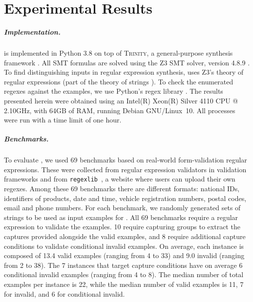 \chapter{Experimental Results}\label{chap:results}

\paragraph{Implementation.}
\Forest{} is implemented in Python 3.8 on top of \textsc{Trinity}, a general-purpose synthesis framework \cite{trinity19}.
All \ac{SMT} formulas are solved using the Z3 SMT solver, version  4.8.9 \cite{z3}. 
To find distinguishing inputs in regular expression synthesis, \Forest uses Z3's theory of regular expressions (part of the theory of strings \cite{z3str317}).
To check the enumerated regexes against the examples, we use Python's regex library \cite{PythonRe}.
%
The results presented herein were obtained using an Intel(R) Xeon(R) Silver 4110 CPU @ 2.10GHz, with 64GB of RAM, running Debian GNU/Linux~10. All processes were run with a time limit of one hour.

\paragraph{Benchmarks.} To evaluate \Forest{}, we used 69 benchmarks based on real-world form-validation regular expressions. These were collected from regular expression validators in validation frameworks and from \texttt{regexlib}~\cite{regexlib}, a website where users can upload their own regexes. Among these 69 benchmarks there are different formats: national IDs, identifiers of products, date and time, vehicle registration numbers, postal codes, email and phone numbers.
For each benchmark, we randomly generated sets of strings to be used as input examples for \Forest{}. 
All 69 benchmarks require a regular expression to validate the examples. 10 require capturing groups to extract the captures provided alongside the valid examples, and 8 require additional capture conditions to validate conditional invalid examples.
On average, each instance is composed of 13.4 valid examples (ranging from 4 to 33) and 9.0 invalid (ranging from 2 to 38). The 7 instances that target capture conditions have on average 6 conditional invalid examples (ranging from 4 to 8). 
The median number of total examples per instance is 22, while the median number of valid examples is 11, 7 for invalid, and 6 for conditional invalid.

